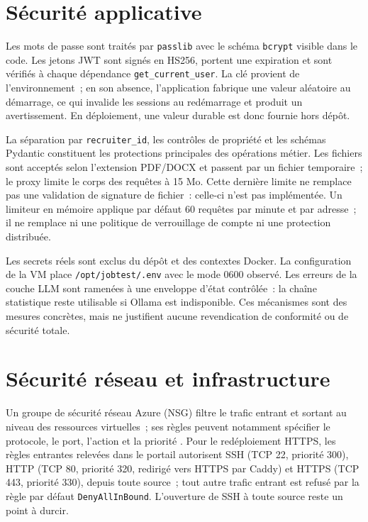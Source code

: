 \section{Sécurité applicative}

Les mots de passe sont traités par \texttt{passlib} avec le schéma \texttt{bcrypt} visible dans le code. Les jetons JWT sont signés en HS256, portent une expiration et sont vérifiés à chaque dépendance \texttt{get\_current\_user}. La clé provient de l'environnement~; en son absence, l'application fabrique une valeur aléatoire au démarrage, ce qui invalide les sessions au redémarrage et produit un avertissement. En déploiement, une valeur durable est donc fournie hors dépôt.

La séparation par \texttt{recruiter\_id}, les contrôles de propriété et les schémas Pydantic constituent les protections principales des opérations métier. Les fichiers sont acceptés selon l'extension PDF/DOCX et passent par un fichier temporaire~; le proxy limite le corps des requêtes à 15 Mo. Cette dernière limite ne remplace pas une validation de signature de fichier~: celle-ci n'est pas implémentée. Un limiteur en mémoire applique par défaut 60 requêtes par minute et par adresse~; il ne remplace ni une politique de verrouillage de compte ni une protection distribuée.

Les secrets réels sont exclus du dépôt et des contextes Docker. La configuration de la VM place \texttt{/opt/jobtest/.env} avec le mode 0600 observé. Les erreurs de la couche LLM sont ramenées à une enveloppe d'état contrôlée~: la chaîne statistique reste utilisable si Ollama est indisponible. Ces mécanismes sont des mesures concrètes, mais ne justifient aucune revendication de conformité ou de sécurité totale.

\section{Sécurité réseau et infrastructure}

Un groupe de sécurité réseau Azure (NSG) filtre le trafic entrant et sortant au niveau des ressources virtuelles~; ses règles peuvent notamment spécifier le protocole, le port, l'action et la priorité \cite{azure_nsg}. Pour le redéploiement HTTPS, les règles entrantes relevées dans le portail autorisent SSH (TCP 22, priorité 300), HTTP (TCP 80, priorité 320, redirigé vers HTTPS par Caddy) et HTTPS (TCP 443, priorité 330), depuis toute source~; tout autre trafic entrant est refusé par la règle par défaut \texttt{DenyAllInBound}. L'ouverture de SSH à toute source reste un point à durcir.

